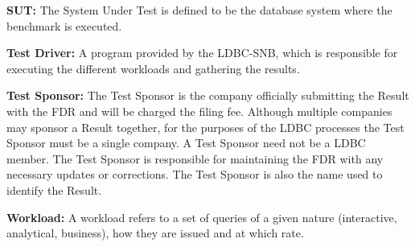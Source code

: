 {\flushleft \textbf{SUT:}} The System Under Test  is defined
to be the database system where the benchmark is executed.


{\flushleft \textbf{Test Driver:}}  A program provided by the LDBC-SNB, which
is responsible for executing the different workloads and gathering the results.

{\flushleft \textbf{Test Sponsor:}} The Test Sponsor is the company officially
submitting the Result with the FDR and will be charged the filing fee. Although
multiple companies may sponsor a Result together, for the purposes of the LDBC
processes the Test Sponsor must be a single company. A Test Sponsor need not be
a LDBC member. The Test Sponsor is responsible for maintaining the FDR with any
necessary updates or corrections. The Test Sponsor is also the name used to
identify the Result.

%



{\flushleft \textbf{Workload:}} A workload refers to a set of queries of a given nature
(\ie interactive, analytical, business), how they are issued and at which rate.

